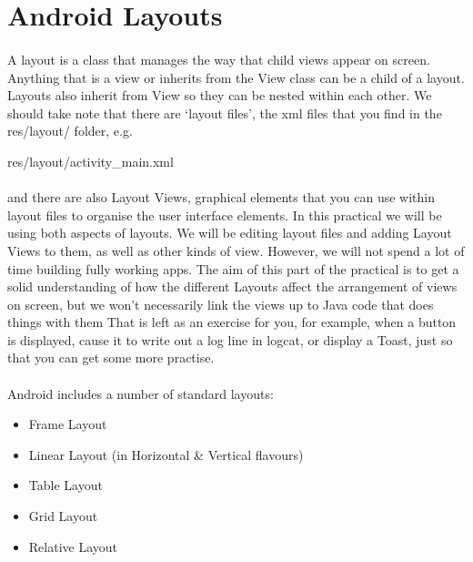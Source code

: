 \section{Android Layouts}
\paragraph{} A layout is a class that manages the way that child views appear on screen. Anything that is a view or inherits from the View class can be a child of a layout. Layouts also inherit from View so they can be nested within each other. We should take note that there are `layout files', the xml files that you find in the res/layout/ folder, e.g.

\begin{framed}
res/layout/activity\_main.xml
\end{framed}

\paragraph{} and there are also Layout Views, graphical elements that you can use within layout files to organise the user interface elements. In this practical we will be using both aspects of layouts. We will be editing layout files and adding Layout Views to them, as well as other kinds of view. However, we will not spend a lot of time building fully working apps. The aim of this part of the practical is to get a solid understanding of how the different Layouts affect the arrangement of views on screen, but we won't necessarily link the views up to Java code that does things with them That is left as an exercise for you, for example, when a button is displayed, cause it to write out a log line in logcat, or display a Toast, just so that you can get some more practise.

\paragraph{} Android includes a number of standard layouts:

\begin{itemize}
\item Frame Layout
\item Linear Layout (in Horizontal \& Vertical flavours)
\item Table Layout
\item Grid Layout
\item Relative Layout
\end{itemize}

